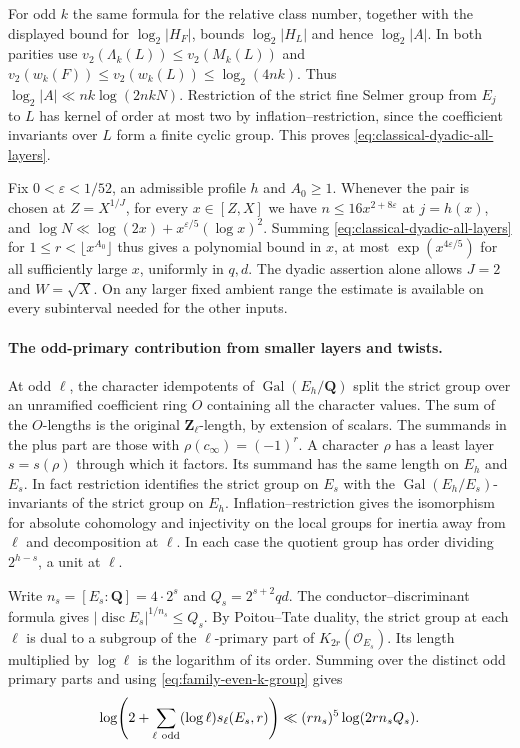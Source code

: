 For odd \(k\) the same formula for the relative class number,
together with the displayed bound for \(\log_2|H_F|\), bounds
\(\log_2|H_L|\) and hence \(\log_2|A|\). In both parities use
\(v_2(\Lambda_k(L))\le v_2(M_k(L))\) and
\(v_2(w_k(F))\le v_2(w_k(L))\le\log_2(4nk)\). Thus
\(\log_2|A|\ll nk\log(2nkN)\).
Restriction of the strict fine Selmer group from \(E_j\) to \(L\)
has kernel of order at most two by inflation--restriction, since
the coefficient invariants over \(L\) form a finite cyclic group.
This proves \eqref{eq:classical-dyadic-all-layers}.

Fix \(0<\varepsilon<1/52\), an admissible profile \(h\) and
\(A_0\ge1\). Whenever the pair is chosen at \(Z=X^{1/J}\), for
every \(x\in[Z,X]\) we have \(n\le16x^{2+8\varepsilon}\) at
\(j=h(x)\), and
\(\log N\ll\log(2x)+x^{\varepsilon/5}(\log x)^2\).
Summing \eqref{eq:classical-dyadic-all-layers} for
\(1\le r<\lfloor x^{A_0}\rfloor\) thus gives a polynomial bound
in \(x\), at most \(\exp(x^{4\varepsilon/5})\) for all sufficiently
large \(x\), uniformly in \(q,d\). The dyadic assertion alone
allows \(J=2\) and \(W=\sqrt X\). On any larger fixed ambient
range the estimate is available on every subinterval needed for
the other inputs.

\paragraph{The odd-primary contribution from smaller layers and twists.}
%
At odd \(\ell\), the character idempotents of
\(\operatorname{Gal}(E_h/\mathbf Q)\) split the strict group over
an unramified coefficient ring \(O\) containing all the character
values. The sum of the \(O\)-lengths is the original
\(\mathbf Z_\ell\)-length, by extension of scalars. The summands in
the plus part are those with \(\rho(c_\infty)=(-1)^r\). A character
\(\rho\) has a least layer \(s=s(\rho)\) through which it factors.
Its summand has the same length on \(E_h\) and \(E_s\). In fact
restriction identifies the strict group on \(E_s\) with the
\(\operatorname{Gal}(E_h/E_s)\)-invariants of the strict group on
\(E_h\). Inflation--restriction gives the isomorphism for absolute
cohomology and injectivity on the local groups for inertia away
from \(\ell\) and decomposition at \(\ell\). In each case the quotient
group has order dividing \(2^{h-s}\), a unit at \(\ell\).

Write \(n_s=[E_s:\mathbf Q]=4\cdot2^s\) and \(Q_s=2^{s+2}qd\).
The conductor--discriminant formula gives
\(|\operatorname{disc} E_s|^{1/n_s}\le Q_s\). By Poitou--Tate
duality, the strict group at each \(\ell\) is dual to a subgroup
of the \(\ell\)-primary part of \(K_{2r}(\mathcal O_{E_s})\).
Its length multiplied by \(\log\ell\) is the logarithm of its
order. Summing over the distinct odd primary parts and using
\eqref{eq:family-even-k-group} gives
\[
 \log\!\left(2+\sum_{\ell\ {\rm odd}}(\log\ell)s_\ell(E_s,r)\right)
 \ll (r n_s)^5\log(2r n_s Q_s).
\]

